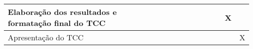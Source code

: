 \begin{table}[ht]
\begin{adjustbox}{width=\textwidth}
\begin{tabular}{|l|l|l|l|l|l|l|l|l|l|l|l|l|}
            Elaboração dos resultados e formatação final do   TCC                                &                        &                        &                        &                        &                        &                        &                        &                        &                        &                        & \multicolumn{1}{c|}{X} &                        \\ \hline
            Apresentação do TCC                                                                  &                        &                        &                        &                        &                        &                        &                        &                        &                        &                        &                        & \multicolumn{1}{c|}{X} \\ \hline
            \end{tabular}
    \end{adjustbox}
\end{table}
